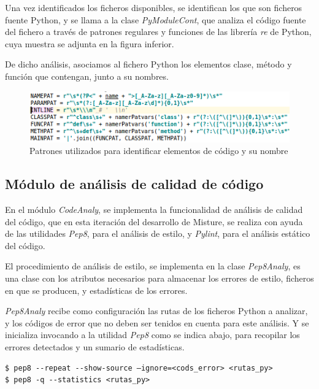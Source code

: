 Una vez identificados los ficheros disponibles, se identifican los que son ficheros fuente Python, y se llama a la clase \textit{PyModuleCont}, que analiza el código fuente del fichero a través de patrones regulares y funciones de las librería \textit{re} de Python, cuya muestra se adjunta en la figura inferior.


De dicho análisis, asociamos al fichero Python los elementos clase, método y función que contengan, junto a su nombres.


\begin{figure}[H]
   \centering
   \includegraphics[width=16cm]{img/Selection_022_pyanaly_regex}
   \caption{Patrones utilizados para identificar elementos de código y su nombre}
   \label{figura:regex}
\end{figure}

\subsection{Módulo de análisis de calidad de código}

En el módulo \textit{CodeAnaly}, se implementa la funcionalidad de análisis de calidad del código, que en esta iteración del desarrollo de Misture, se realiza con ayuda de las utilidades \textit{Pep8}, para el análisis de estilo, y \textit{Pylint}, para el análisis estático del código.


El procedimiento de análisis de estilo, se implementa en la clase \textit{Pep8Analy}, es una clase con los atributos necesarios para almacenar los errores de estilo, ficheros en que se producen, y estadísticas de los errores.


\textit{Pep8Analy}  recibe como configuración las rutas de los ficheros Python a analizar, y los códigos de error que no deben ser tenidos en cuenta para este análisis. Y se inicializa invocando a la utilidad \textit{Pep8} como se indica abajo, para recopilar los errores detectados y un sumario de estadísticas.

\begin{center}
\begin{verbatim}
$ pep8 --repeat --show-source –ignore=<cods_error> <rutas_py>
$ pep8 -q --statistics <rutas_py>
\end{verbatim}
\end{center}


